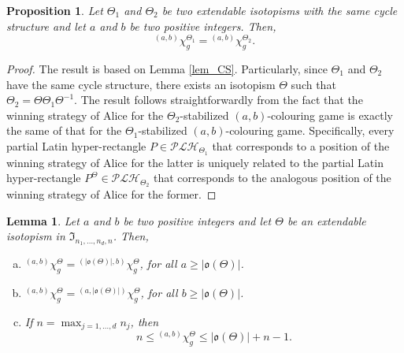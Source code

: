 \documentclass{article}
\newtheorem{prop}[thm]{Proposition}
\newtheorem{lem}[thm]{Lemma}
\begin{document}
\begin{prop}\label{prop_CS} Let $\Theta_1$ and $\Theta_2$ be two extendable isotopisms with the same cycle structure and let $a$ and $b$ be two positive integers. Then, 
\[{}^{(a,b)}\chi_g^{\Theta_1}={}^{(a,b)}\chi_g^{\Theta_2}.\]
\end{prop}

\begin{proof} The result is based on Lemma \ref{lem_CS}. Particularly, since $\Theta_1$ and $\Theta_2$ have the same cycle structure, there exists an isotopism $\Theta$ such that $\Theta_2=\Theta\Theta_1\Theta^{-1}$. The result follows straightforwardly from the fact that the winning strategy of Alice for the $\Theta_2$-stabilized $(a,b)$-colouring game is exactly the same of that for the $\Theta_1$-stabilized $(a,b)$-colouring game. Specifically, every partial Latin hyper-rectangle $P\in\mathcal{PLH}_{\Theta_1}$ that corresponds to a position of the winning strategy of Alice for the latter is uniquely related to the partial Latin hyper-rectangle $P^{\Theta}\in\mathcal{PLH}_{\Theta_2}$ that corresponds to the analogous position of the winning strategy of Alice for the former.
\end{proof}

\vspace{0.1cm}

\begin{lem} \label{lem_Bounds} Let $a$ and $b$ be two positive integers and let $\Theta$ be an extendable isotopism in $\mathfrak{I}_{n_1,\ldots,n_d,n}$. Then,
\begin{enumerate}[a)]
\item ${}^{(a,b)}\chi_g^{\Theta}={}^{(|\mathfrak{o}(\Theta)|,b)}\chi_g^{\Theta}$, for all $a\geq |\mathfrak{o}(\Theta)|$.
\item ${}^{(a,b)}\chi_g^{\Theta}={}^{(a,|\mathfrak{o}(\Theta)|)}\chi_g^{\Theta}$, for all $b\geq |\mathfrak{o}(\Theta)|$.
\item If $n=\max_{j=1,\ldots,d} n_j$, then
\[n\le {}^{(a,b)}\chi_g^{\Theta}\le |\mathfrak{o}(\Theta)|+n-1.\]
\end{enumerate}
\end{lem}
\end{document}
